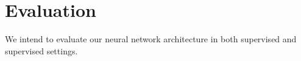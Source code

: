 \documentclass[twoside,twocolumn]{article}
\begin{document}






\section{Evaluation}
We intend to evaluate our neural network architecture in both supervised and
supervised settings.





\end{document}
